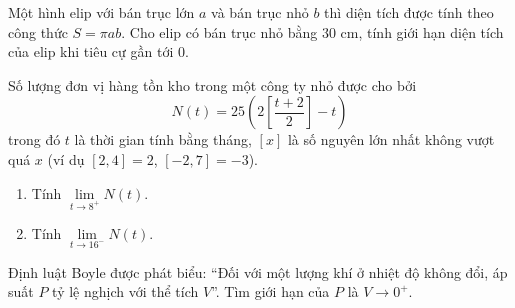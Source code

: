 \begin{bt}%
	Một hình elip với bán trục lớn $a$ và bán trục nhỏ $b$ thì diện tích được tính theo công thức $S=\pi ab$. Cho elip có bán trục nhỏ bằng $30$ cm, tính giới hạn diện tích của elip khi tiêu cự gần tới $0$.
\end{bt}





\begin{bt}%
	Số lượng đơn vị hàng tồn kho trong một công ty nhỏ được cho bởi
	$$
	N(t)=25\left(2 \left [\frac{t+2}{2}  \right ]-t\right)
	$$
	trong đó $t$ là thời gian tính bằng tháng, $[x]$ là số nguyên lớn nhất không vượt quá $x$ (ví dụ $[2{,}4]=2$, $[-2{,}7] = -3$).
	\begin{enumerate}
		\item Tính $\lim\limits_{t \to 8^+} N(t)$.
		\item  Tính $\lim\limits_{t \to 16^-} N(t)$.
	\end{enumerate}
\end{bt}


\begin{bt}%
	Định luật Boyle được phát biểu:  ``Đối với một lượng khí ở nhiệt độ không đổi, áp suất $P$ tỷ lệ nghịch với thể tích $V$''. Tìm giới hạn của $P$ là $V \rightarrow 0^{+}$.
\end{bt}

